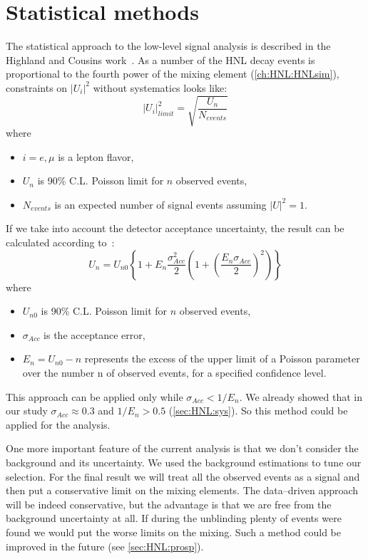 \documentclass[../main.tex]{subfiles}
\begin{document}
\section{Statistical methods}
\label{sec:HNL:stat}
The statistical approach to the low-level signal analysis is described in the Highland and Cousins work~\cite{Cousins1992}. As a number of the HNL decay events is proportional to the fourth power of the mixing element (\autoref{ch:HNL:HNLsim}), constraints on $\left|U_i\right|^2$ without systematics looks like:
\begin{equation}
  \left|U_i\right|^2_{limit}=\sqrt{\frac{U_n}{N_{events}}}
  \label{eq:HNL:constraints}
\end{equation}
where
\begin{itemize}
    \item $i=e,\mu$ is a lepton flavor,
    \item $U_n$ is 90\% C.L. Poisson limit for $n$ observed events,
    \item $N_{events}$ is an expected number of signal events assuming $\left|U\right|^2=1$.
\end{itemize}
If we take into account the detector acceptance uncertainty, the result can be calculated according to~\cite{Cousins1992}:
\begin{equation}
  U_n=U_{n0}\left\{1+E_n\frac{\sigma^2_{Acc}}{2}\left(1+\left(\frac{E_n\sigma_{Acc}}{2}\right)^2\right)\right\}
  \label{eq:HNL:constrainsAcc}
\end{equation}
where
\begin{itemize}
    \item $U_{n0}$ is 90\% C.L. Poisson limit for $n$ observed events,
    \item $\sigma_{Acc}$ is the acceptance error,
    \item $E_n=U_{n0}-n$ represents the excess of the upper limit of a Poisson parameter over the number n of observed events, for a specified confidence level.
\end{itemize}
This approach can be applied only while $\sigma_{Acc}<1/E_n$. We already showed that in our study $\sigma_{Acc}\approx0.3$ and $1/E_n>0.5$ (\autoref{sec:HNL:sys}). So this method could be applied for the analysis.

One more important feature of the current analysis is that we don't consider the background and its uncertainty. We used the background estimations to tune our selection. For the final result we will treat all the observed events as a signal and then put a conservative limit on the mixing elements. The data--driven approach will be indeed conservative, but the advantage is that we are free from the background uncertainty at all. If during the unblinding plenty of events were found we would put the worse limits on the mixing. Such a method could be improved in the future (see \autoref{sec:HNL:prosp}).
\end{document}
